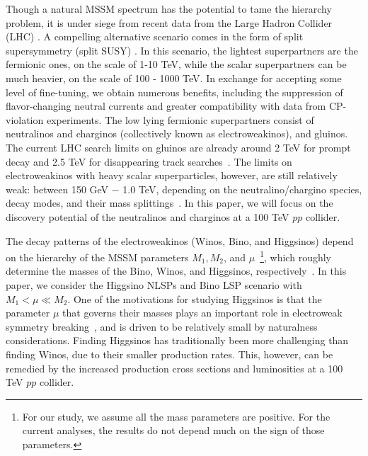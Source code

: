 \documentclass[a4paper,11pt]{article}
\begin{document}
Though a natural MSSM spectrum has the potential to tame the hierarchy problem,
it is under siege from recent data from the Large Hadron Collider (LHC)
\cite{Aaboud:2018ujj, Sirunyan:2018vjp}.  A compelling alternative scenario
comes in the form of split supersymmetry (split SUSY) \cite{Wells:2003tf,
ArkaniHamed:2004yi, Giudice:2004tc}. In this scenario, the lightest
superpartners are the fermionic ones, on the scale of 1-10 TeV, while the
scalar superpartners can be much heavier, on the scale of 100 - 1000 TeV. In
exchange for accepting some level of fine-tuning, we obtain numerous benefits,
including the suppression of flavor-changing neutral currents and greater
compatibility with data from CP-violation experiments.  The low lying fermionic
superpartners consist of neutralinos and charginos (collectively known as
electroweakinos), and gluinos. The current LHC search limits on gluinos are
already around 2 TeV for prompt decay and 2.5 TeV for disappearing track
searches~\cite{CMS-PAS-SUS-19-005}. The limits on electroweakinos with
  heavy scalar superparticles, however, are still relatively weak: between 150
  GeV $-$ 1.0 TeV, depending on the neutralino/chargino species, decay modes,
  and their mass splittings~\cite{ATL-PHYS-PUB-2019-022, Sirunyan:2017lae,
    Sirunyan:2018ubx, Aaboud:2018htj, Aaboud:2018zeb, Aad:2019qnd, Aad:2019vvf,
  Aad:2019vnb, Aaboud:2018ngk, Aaboud:2018sua, Aaboud:2018jiw, Aaboud:2017leg,
Aaboud:2017mpt, Aaboud:2017nhr}.  In this paper, we will focus on the discovery
potential of the neutralinos and charginos at a 100 TeV $pp$ collider. 



The decay patterns of the electroweakinos (Winos, Bino, and Higgsinos) depend
on the hierarchy of the MSSM parameters $M_1, M_2$, and $\mu$~\footnote{For our
study, we assume all the mass parameters are positive.  For the current
analyses, the results do not depend much on the sign of those parameters.},
which roughly determine the masses of the Bino, Winos, and Higgsinos,
respectively~\cite{Han:2013kza}.  In this paper, we consider the Higgsino NLSPs
and Bino LSP scenario with $M_1 < \mu \ll M_2$.  One of the motivations for
studying Higgsinos is that the parameter $\mu$ that governs their masses plays an
important role in electroweak symmetry breaking~\cite{Acharya:2014pua}, and
is driven to be relatively small by naturalness considerations. 
Finding Higgsinos has traditionally been more challenging than finding Winos,
due to their smaller production rates.
This, however, can be remedied by the increased production cross sections and 
luminosities at a 100 TeV $pp$ collider.
\end{document}
